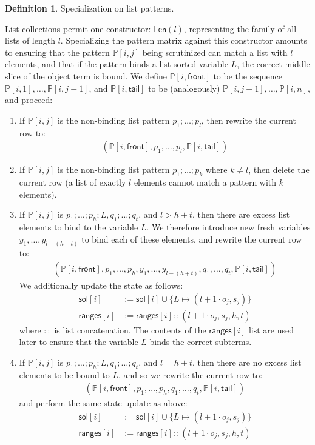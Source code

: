 \documentclass{article}
\theoremstyle{definition}
\newtheorem{definition}{Definition}[section]
\newcommand{\listcst}{\mathsf{Len}}
\newcommand{\sol}{\mathsf{sol}}
\newcommand{\lslen}{\mathsf{ranges}}
\newcommand{\PP}{\mathbb{P}}
\newcommand{\front}{\mathsf{front}}
\newcommand{\tail}{\mathsf{tail}}
\begin{document}
\begin{definition}{Specialization on list patterns.}

List collections permit one constructor: $\listcst(l)$, representing the family
of all lists of length $ l $. Specializing the pattern matrix against this
constructor amounts to ensuring that the pattern $ \PP[i, j] $ being scrutinized
can match a list with $ l $ elements, and that if the pattern binds a
list-sorted variable $ L $, the correct middle slice of the object term is
bound. We define $ \PP[i, \front] $ to be the sequence $ \PP[i, 1], \dots,
\PP[i, j-1] $, and $ \PP[i, \tail] $ to be (analogously) $ \PP[i, j + 1], \dots,
\PP[i, n] $, and proceed:
\begin{enumerate}

  \item If $ \PP[i, j] $ is the non-binding list pattern $ p_1; \dots; p_l $,
    then rewrite the current row to:
    \begin{align*}
      (\PP[i, \front], p_1, \dots, p_l, \PP[i, \tail])
    \end{align*}

  \item If $ \PP[i, j] $ is the non-binding list pattern $ p_1; \dots; p_k $
    where $ k \neq l $, then delete the current row (a list of exactly $ l $
    elements cannot match a pattern with $ k $ elements).

  \item If $ \PP[i, j] $ is $ p_1; \dots; p_h; L, q_1; \dots; q_t $, and $ l > h
    + t $, then there are excess list elements to bind to the variable $ L $. We
    therefore introduce new fresh variables $ y_1, \dots, y_{l-(h+t)} $ to bind
    each of these elements, and rewrite the current row to:
    \begin{align*}
      (\PP[i, \front], p_1, \dots, p_h, y_1, \dots, y_{l-(h+t)}, q_1, \dots, q_t, \PP[i, \tail])
    \end{align*}
    We additionally update the state as follows:
    \begin{align*}
      \sol[i]   & := \sol[i] \cup \{ L \mapsto (l + 1 \cdot o_j, s_j) \} \\
      \lslen[i] & := \lslen[i] :: (l + 1 \cdot o_j, s_j, h, t)
    \end{align*}
    where $ :: $ is list concatenation. The contents of the $ \lslen[i] $ list
    are used later to ensure that the variable $ L $ binds the correct subterms.

  \item If $ \PP[i, j] $ is $ p_1; \dots; p_h; L, q_1; \dots; q_t $, and $ l = h
    + t $, then there are no excess list elements to be bound to $ L $, and so
    we rewrite the current row to:
    \begin{align*}
      (\PP[i, \front], p_1, \dots, p_h, q_1, \dots, q_t, \PP[i, \tail])
    \end{align*}
    and perform the same state update as above:
    \begin{align*}
      \sol[i]   & := \sol[i] \cup \{ L \mapsto (l + 1 \cdot o_j, s_j) \} \\
      \lslen[i] & := \lslen[i] :: (l + 1 \cdot o_j, s_j, h, t)
    \end{align*}


\end{enumerate}
\end{definition}
\end{document}
